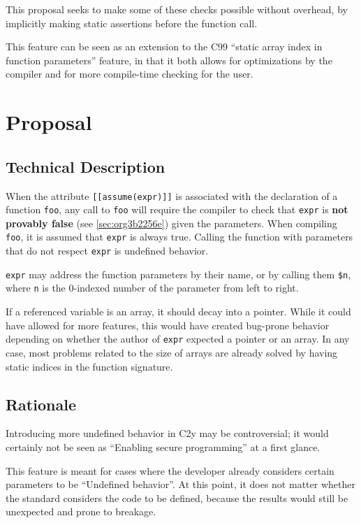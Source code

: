 \documentclass[a4paper, 12pt]{article}
\begin{document}
This proposal seeks to make some of these checks possible without overhead, by implicitly
making static assertions before the function call.

This feature can be seen as an extension to the C99 ``static array index in
function parameters'' feature, in that it both allows for optimizations by the
compiler and for more compile-time checking for the user.
\section{Proposal}
\label{sec:org3161b3f}
\subsection{Technical Description}
\label{sec:org9eb89d5}
When the attribute \texttt{[[assume(expr)]]} is associated with the declaration of a
function \texttt{foo}, any call to \texttt{foo} will require the compiler to check that \texttt{expr}
is \textbf{not provably false} (see \ref{sec:org3b2256e}) given the parameters.
When compiling \texttt{foo}, it is assumed that \texttt{expr} is always true.  Calling the
function with parameters that do not respect \texttt{expr} is undefined behavior.

\texttt{expr} may address the function parameters by their name, or by calling them
\texttt{\$n}, where \texttt{n} is the 0-indexed number of the parameter from left to right.

If a referenced variable is an array, it should decay into a pointer.  While it
could have allowed for more features, this would have created bug-prone behavior
depending on whether the author of \texttt{expr} expected a pointer or an array.  In any
case, most problems related to the size of arrays are already solved by having
static indices in the function signature.
\subsection{Rationale}
\label{sec:org6c19d62}
Introducing more undefined behavior in C2y may be controversial; it would certainly
not be seen as ``Enabling secure programming'' at a first glance.

This feature is meant for cases where the developer already considers certain
parameters to be ``Undefined behavior''.  At this point, it does not matter
whether the standard considers the code to be defined, because the results would
still be unexpected and prone to breakage.
\end{document}
